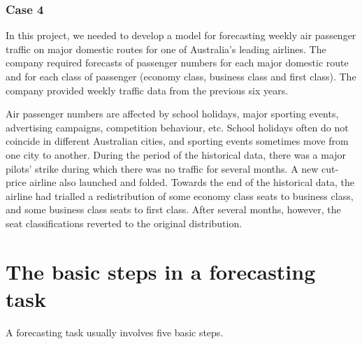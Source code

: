 \documentclass[]{book}
\begin{document}
\hypertarget{case-4}{%
\subsubsection*{Case 4}\label{case-4}}

In this project, we needed to develop a model for forecasting weekly air passenger traffic on major domestic routes for one of Australia's leading airlines. The company required forecasts of passenger numbers for each major domestic route and for each class of passenger (economy class, business class and first class). The company provided weekly traffic data from the previous six years.

Air passenger numbers are affected by school holidays, major sporting events, advertising campaigns, competition behaviour, etc. School holidays often do not coincide in different Australian cities, and sporting events sometimes move from one city to another. During the period of the historical data, there was a major pilots' strike during which there was no traffic for several months. A new cut-price airline also launched and folded. Towards the end of the historical data, the airline had trialled a redistribution of some economy class seats to business class, and some business class seats to first class. After several months, however, the seat classifications reverted to the original distribution.

\hypertarget{the-basic-steps-in-a-forecasting-task}{%
\section{The basic steps in a forecasting task}\label{the-basic-steps-in-a-forecasting-task}}

A forecasting task usually involves five basic steps.
\end{document}
